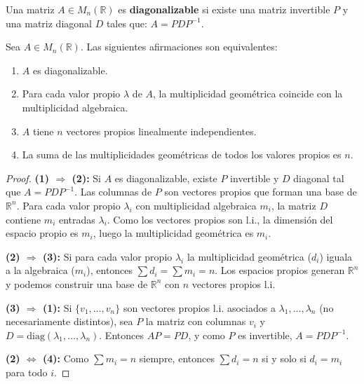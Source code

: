 \begin{definition}
Una matriz $A \in M_n(\mathbb{R})$ es \textbf{diagonalizable} si existe una matriz invertible $P$ y una matriz diagonal $D$ tales que: \(A = PDP^{-1}.\)
\end{definition}


\begin{theorem}\label{thm:cap08:diagonalizacion}
Sea $A \in M_n(\mathbb{R})$. Las siguientes afirmaciones son equivalentes:
\begin{enumerate}[$(1)$]
    \item $A$ es diagonalizable.
    \item Para cada valor propio $\lambda$ de $A$, la multiplicidad geométrica coincide con la multiplicidad algebraica.
    \item $A$ tiene $n$ vectores propios linealmente independientes.
    \item La suma de las multiplicidades geométricas de todos los valores propios es $n$.
\end{enumerate}


\begin{proof} \textbf{(1) $\Rightarrow$ (2):} Si $A$ es diagonalizable, existe $P$ invertible y $D$ diagonal tal que $A = PDP^{-1}$. Las columnas de $P$ son vectores propios que forman una base de $\mathbb{R}^n$. Para cada valor propio $\lambda_i$ con multiplicidad algebraica $m_i$, la matriz $D$ contiene $m_i$ entradas $\lambda_i$. Como los vectores propios son l.i., la dimensión del espacio propio es $m_i$, luego la multiplicidad geométrica es $m_i$.

\textbf{(2) $\Rightarrow$ (3):} Si para cada valor propio $\lambda_i$ la multiplicidad geométrica ($d_i$) iguala a la algebraica ($m_i$), entonces $\sum d_i = \sum m_i = n$. Los espacios propios generan $\mathbb{R}^n$ y podemos construir una base de $\mathbb{R}^n$ con $n$ vectores propios l.i.

\textbf{(3) $\Rightarrow$ (1):} Si $\{v_1,\dots,v_n\}$ son vectores propios l.i. asociados a $\lambda_1,\dots,\lambda_n$ (no necesariamente distintos), sea $P$ la matriz con columnas $v_i$ y $D = \text{diag}(\lambda_1,\dots,\lambda_n)$. Entonces $AP = PD$, y como $P$ es invertible, $A = PDP^{-1}$.

\textbf{(2) $\Leftrightarrow$ (4):} Como $\sum m_i = n$ siempre, entonces $\sum d_i = n$ si y solo si $d_i = m_i$ para todo $i$.
\end{proof}
\end{theorem}

